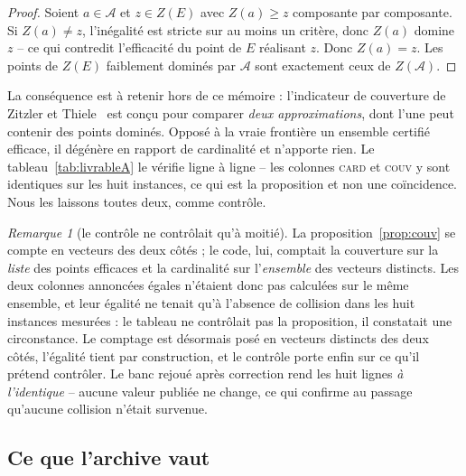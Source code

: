 \documentclass[11pt,a4paper]{article}
\theoremstyle{plain}
\theoremstyle{remark}
\newtheorem{remark}{Remarque}
\begin{document}
\begin{proof}
Soient $a\in\mathcal{A}$ et $z\in Z(E)$ avec $Z(a)\ge z$ composante par
composante. Si $Z(a)\neq z$, l'inégalité est stricte sur au moins un
critère, donc $Z(a)$ domine $z$ -- ce qui contredit l'efficacité du point de
$E$ réalisant $z$. Donc $Z(a)=z$. Les points de $Z(E)$ faiblement dominés
par $\mathcal{A}$ sont exactement ceux de $Z(\mathcal{A})$.
\end{proof}

\noindent
La conséquence est à retenir hors de ce mémoire : l'indicateur de couverture
de Zitzler et Thiele~\cite{zitzler1999} est conçu pour comparer \emph{deux
approximations},
dont l'une peut contenir des points dominés. Opposé à la vraie frontière un
ensemble certifié efficace, il dégénère en rapport de cardinalité et
n'apporte rien. Le tableau~\ref{tab:livrableA} le vérifie ligne à ligne --
les colonnes \textsc{card} et \textsc{couv} y sont identiques sur les huit
instances, ce qui est la proposition et non une coïncidence. Nous les
laissons toutes deux, comme contrôle.

\begin{remark}[le contrôle ne contrôlait qu'à moitié]
La proposition~\ref{prop:couv} se compte en vecteurs des deux côtés ; le
code, lui, comptait la couverture sur la \emph{liste} des points efficaces
et la cardinalité sur l'\emph{ensemble} des vecteurs distincts. Les deux
colonnes annoncées égales n'étaient donc pas calculées sur le même ensemble,
et leur égalité ne tenait qu'à l'absence de collision dans les huit
instances mesurées : le tableau ne contrôlait pas la proposition, il
constatait une circonstance. Le comptage est désormais posé en vecteurs
distincts des deux côtés, l'égalité tient par construction, et le contrôle
porte enfin sur ce qu'il prétend contrôler. Le banc rejoué après correction
rend les huit lignes \emph{à l'identique} -- aucune valeur publiée ne
change, ce qui confirme au passage qu'aucune collision n'était survenue.
\end{remark}

\subsection{Ce que l'archive vaut}
\end{document}
